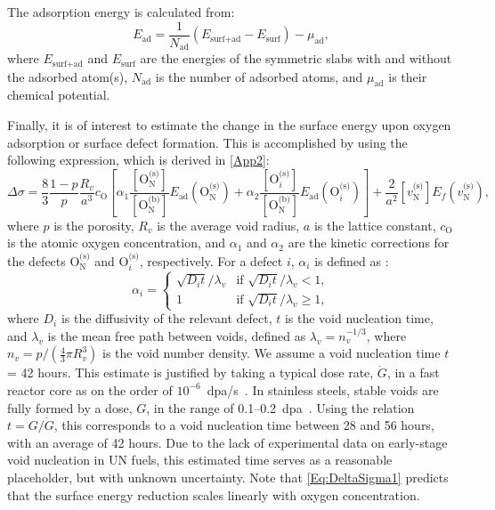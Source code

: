 \documentclass[preprint,12pt,sort&compress]{elsarticle}
\newcommand{\?}{\stackrel{?}{=}}
\begin{document}
The adsorption energy is calculated from:
\begin{equation}
E_\text{ad} = \frac{1}{N_\text{ad}} \left( E_\text{surf+ad} - E_\text{surf} \right) - \mu_\text{ad},
\label{Eq:Ead}
\end{equation}
where $E_\text{surf+ad}$ and $E_\text{surf}$ are the energies of the symmetric slabs with and without the adsorbed atom(s), $N_\text{ad}$ is the number of adsorbed atoms, and $\mu_\text{ad}$ is their chemical potential. 

Finally, it is of interest to estimate the change in the surface energy upon oxygen adsorption or surface defect formation. This is accomplished by using the following expression, which is derived in \ref{App2}:
\begin{equation}
\Delta \sigma = \frac{8}{3} \frac{1-p}{p} \frac{R_v}{a^3} c_\text{O} \left[ \alpha_1 \frac{ [ \text{O}_\text{N}^{\text{(s)}} ] }{ [ \text{O}_\text{N}^{\text{(b)}} ] }  E_\text{ad}( \text{O}_\text{N}^{\text{(s)}} ) + \alpha_2 \frac{ [ \text{O}_i^{\text{(s)}} ] }{ [ \text{O}_\text{N}^{\text{(b)}} ] }  E_\text{ad}( \text{O}_i^{\text{(s)}} ) \right] + \frac{2}{a^2} [ v_\text{N}^{\text{(s)}} ] E_f ( v_\text{N}^{\text{(s)}} ),
\label{Eq:DeltaSigma1}
\end{equation}
where $p$ is the porosity, $R_v$ is the average void radius, $a$ is the lattice constant, $c_\text{O}$ is the atomic oxygen concentration, and $\alpha_1$ and $\alpha_2$ are the kinetic corrections for the defects $\text{O}_\text{N}^\text{(s)}$ and $\text{O}_i^{\text{(s)}}$, respectively. For a defect $i$, $\alpha_i$ is defined as \cite{Zinkle1990}:
\begin{equation}
\alpha_i =
\begin{cases}
    \sqrt{D_i t}/\lambda_v & \text{if } \sqrt{D_i t}/\lambda_v < 1, \\
    1 & \text{if } \sqrt{D_i t}/\lambda_v \geq 1,
\end{cases}
\label{Eq:alpha}
\end{equation}
where $D_i$ is the diffusivity of the relevant defect, $t$ is the void nucleation time, and $\lambda_v$ is the mean free path between voids, defined as $\lambda_v = n_v^{-1/3}$, where $n_v = p / ( \frac{4}{3} \pi R_v^3 )$ is the void number density. We assume a void nucleation time $t$ = 42 hours. This estimate is justified by taking a typical dose rate, $\dot{G}$, in a fast reactor core as on the order of $10^{-6}$~dpa/s~\cite{Mansur1983, Saha2018}. In stainless steels, stable voids are fully formed by a dose, $G$, in the range of 0.1--0.2~dpa~\cite{Surh2004}. Using the relation $t = G / \dot{G}$, this corresponds to a void nucleation time between 28 and 56 hours, with an average of 42 hours. Due to the lack of experimental data on early-stage void nucleation in UN fuels, this estimated time serves as a reasonable placeholder, but with unknown uncertainty. Note that \cref{Eq:DeltaSigma1} predicts that the surface energy reduction scales linearly with oxygen concentration.
\end{document}
